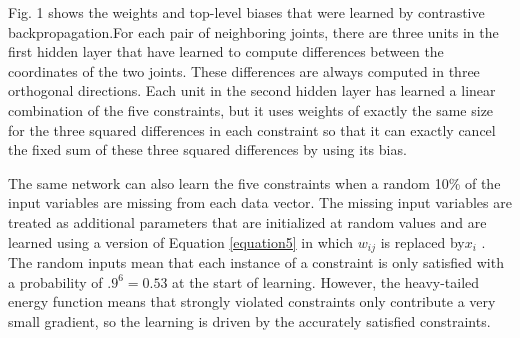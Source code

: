 \par{Fig. 1 shows the weights and top-level biases that were learned by contrastive backpropagation.For each pair of neighboring joints, there are three units in the first hidden layer that have learned to compute differences between the coordinates of the two joints. These differences are always computed in three orthogonal directions. Each unit in the second hidden layer has learned a linear combination of the five constraints, but it uses weights of exactly the same size for the three squared differences in each constraint so that it can exactly cancel the fixed sum of these three squared differences by using its bias.
}
\par{The same network can also learn the five constraints when a random 10\% of the input variables are missing from each data vector. The missing input variables are treated as additional parameters that are initialized at random values and are learned using a version of Equation \ref{equation5} in which ${w_{ij}}$  is replaced by${x_i}$  . The random inputs mean that each instance of a constraint is only satisfied with a probability of ${.9^6} = 0.53$  at the start of learning. However, the heavy-tailed energy function means that strongly violated constraints only contribute a very small gradient, so the learning is driven by the accurately satisfied constraints.
}
